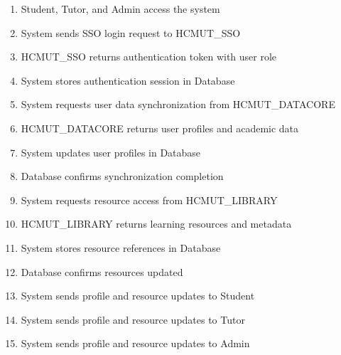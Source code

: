 \begin{enumerate}
    \item Student, Tutor, and Admin access the system
    \item System sends SSO login request to HCMUT\_SSO
    \item HCMUT\_SSO returns authentication token with user role
    \item System stores authentication session in Database
    \item System requests user data synchronization from HCMUT\_DATACORE
    \item HCMUT\_DATACORE returns user profiles and academic data
    \item System updates user profiles in Database
    \item Database confirms synchronization completion
    \item System requests resource access from HCMUT\_LIBRARY
    \item HCMUT\_LIBRARY returns learning resources and metadata
    \item System stores resource references in Database
    \item Database confirms resources updated
    \item System sends profile and resource updates to Student
    \item System sends profile and resource updates to Tutor
    \item System sends profile and resource updates to Admin
\end{enumerate}